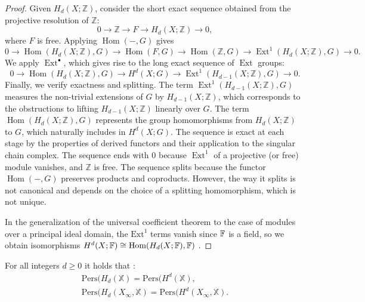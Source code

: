 \begin{proof}
Given \( H_d(X; \mathbb{Z}) \), consider the short exact sequence obtained from the projective resolution of \( \mathbb{Z} \):
\[
0 \rightarrow \mathbb{Z} \rightarrow F \rightarrow H_d(X; \mathbb{Z}) \rightarrow 0,
\]
where \( F \) is free. Applying \( \operatorname{Hom}(-, G) \) gives
\[
0 \rightarrow \operatorname{Hom}(H_d(X; \mathbb{Z}), G) \rightarrow \operatorname{Hom}(F, G) \rightarrow \operatorname{Hom}(\mathbb{Z}, G) \rightarrow \operatorname{Ext}^1(H_d(X; \mathbb{Z}), G) \rightarrow 0.
\]
We apply \( \operatorname{Ext}^\bullet \), which gives rise to the long exact sequence of \( \operatorname{Ext} \) groups:
\[
0 \rightarrow \operatorname{Hom}(H_d(X; \mathbb{Z}), G) \rightarrow H^d(X; G) \rightarrow \operatorname{Ext}^1(H_{d-1}(X; \mathbb{Z}), G) \rightarrow 0.
\]
Finally, we verify exactness and splitting. The term \( \operatorname{Ext}^1(H_{d-1}(X; \mathbb{Z}), G) \) measures the non-trivial extensions of \( G \) by \( H_{d-1}(X; \mathbb{Z}) \), which corresponds to the obstructions to lifting \( H_{d-1}(X; \mathbb{Z}) \) linearly over \( G \). The term \( \operatorname{Hom}(H_d(X; \mathbb{Z}), G) \) represents the group homomorphisms from \( H_d(X; \mathbb{Z}) \) to \( G \), which naturally includes in \( H^d(X; G) \). The sequence is exact at each stage by the properties of derived functors and their application to the singular chain complex. The sequence ends with \( 0 \) because \( \operatorname{Ext}^1 \) of a projective (or free) module vanishes, and \( \mathbb{Z} \) is free. The sequence splits because the functor \( \operatorname{Hom}(-, G) \) preserves products and coproducts. However, the way it splits is not canonical and depends on the choice of a splitting homomorphism, which is not unique.

In the generalization of the universal coefficient theorem to the case of modules over a principal ideal domain, the $\text{Ext}^1$ terms vanish since ${\mathbb F}$ is a field, so we obtain isomorphisms $H^d(X;{\mathbb F}) \cong {\text{Hom}}(H_d(X;{\mathbb F}),{\mathbb F})$ \cite[p.198 §3.3.1]{hatcher2005algebraic}.
\end{proof}

\begin{theorem}
For all integers $d \geq 0$ it holds that \cite[§2.3]{de2011dualities}:
\begin{align*}
	\text{Pers}(H_d(\mathbb{X}) = \text{Pers}(H^d(\mathbb{X}), \\
	\text{Pers}(H_d(X_\infty, \mathbb{X}) = \text{Pers}(H^d(X_\infty, \mathbb{X}).
\end{align*}
\end{theorem}

